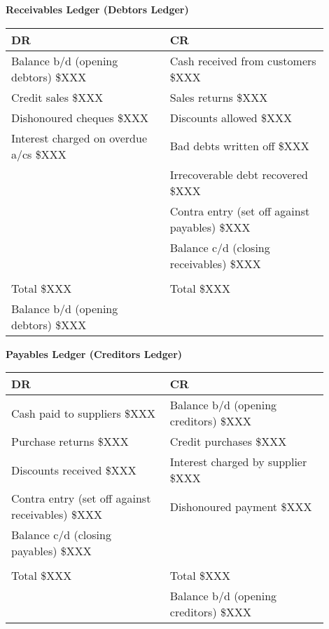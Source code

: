 \newpage




\textbf{Receivables Ledger (Debtors Ledger)}\\[3pt]
\begin{tabular}{@{}p{0.45\linewidth} p{0.45\linewidth}@{}}
\textbf{DR} & \textbf{CR} \\ \midrule
Balance b/d (opening debtors) \hfill \$XXX & Cash received from customers \hfill \$XXX \\
Credit sales \hfill \$XXX & Sales returns \hfill \$XXX \\
Dishonoured cheques \hfill \$XXX & Discounts allowed \hfill \$XXX \\
Interest charged on overdue a/cs \hfill \$XXX & Bad debts written off \hfill \$XXX \\
& Irrecoverable debt recovered \hfill \$XXX \\
& Contra entry (set off against payables) \hfill \$XXX \\
& Balance c/d (closing receivables) \hfill \$XXX \\[3pt]
\multicolumn{2}{c}{\hrulefill} \\
Total \hfill \$XXX & Total \hfill \$XXX \\[6pt]
Balance b/d (opening debtors) \hfill \$XXX & \\
\end{tabular}

\vspace{1cm}


\textbf{Payables Ledger (Creditors Ledger)}\\[3pt]
\begin{tabular}{@{}p{0.45\linewidth} p{0.45\linewidth}@{}}
\textbf{DR} & \textbf{CR} \\ \midrule
Cash paid to suppliers \hfill \$XXX & Balance b/d (opening creditors) \hfill \$XXX \\
Purchase returns \hfill \$XXX & Credit purchases \hfill \$XXX \\
Discounts received \hfill \$XXX & Interest charged by supplier \hfill \$XXX \\
Contra entry (set off against receivables) \hfill \$XXX & Dishonoured payment \hfill \$XXX \\
Balance c/d (closing payables) \hfill \$XXX & \\[3pt]
\multicolumn{2}{c}{\hrulefill} \\
Total \hfill \$XXX & Total \hfill \$XXX \\[6pt]
& Balance b/d (opening creditors) \hfill \$XXX \\
\end{tabular}

